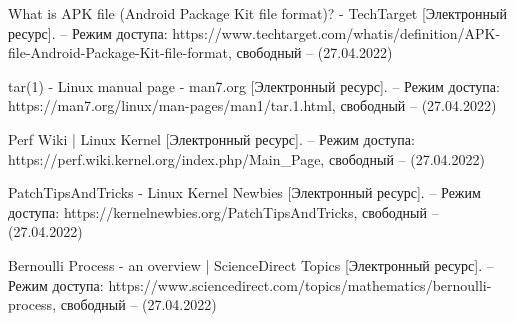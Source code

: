 \begin{thebibliography}{}
	What is APK file (Android Package Kit file format)? - TechTarget [Электронный ресурс]. – Режим доступа: 	https://www.techtarget.com/whatis/definition/APK-file-Android-Package-Kit-file-format, свободный – (27.04.2022)
	
	tar(1) - Linux manual page - man7.org [Электронный ресурс]. – Режим доступа: https://man7.org/linux/man-pages/man1/tar.1.html, свободный – (27.04.2022)
	
	Perf Wiki | Linux Kernel  [Электронный ресурс]. – Режим доступа: https://perf.wiki.kernel.org/index.php/Main\_Page, свободный – (27.04.2022)
	
	PatchTipsAndTricks - Linux Kernel Newbies  [Электронный ресурс]. – Режим доступа: https://kernelnewbies.org/PatchTipsAndTricks, свободный – (27.04.2022)
	
	Bernoulli Process - an overview | ScienceDirect Topics [Электронный ресурс]. – Режим доступа: https://www.sciencedirect.com/topics/mathematics/bernoulli-process, свободный – (27.04.2022)
\end{thebibliography}
\endgroup

\pagebreak